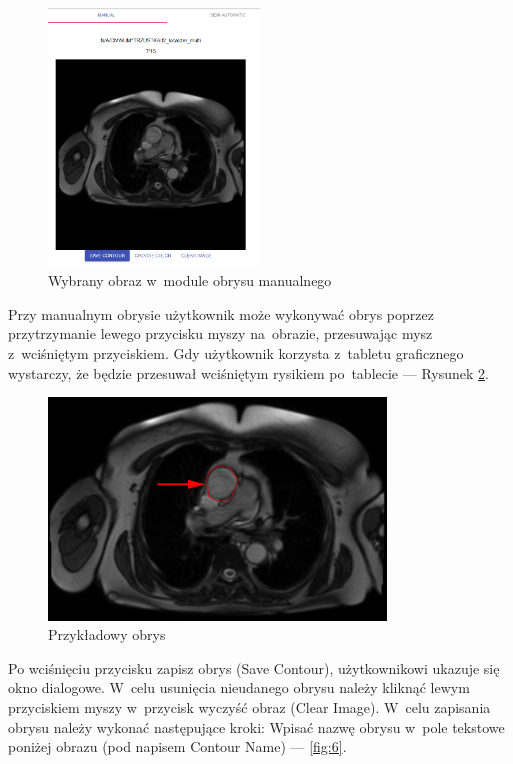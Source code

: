 \documentclass[a4paper,11pt,twoside,openright]{report}
\theoremstyle{definition}
\begin{document}
\begin{enumerate}
\begin{figure}[h!]
	\center
	\includegraphics[width=0.5\textwidth]{4}
	\caption{Wybrany obraz w~module obrysu manualnego}
    	\label{fig:4}
\end{figure}

Przy manualnym obrysie użytkownik może wykonywać obrys poprzez przytrzymanie
lewego przycisku myszy na~obrazie, przesuwając mysz z~wciśniętym przyciskiem.
Gdy użytkownik korzysta z~tabletu graficznego wystarczy, że będzie przesuwał
wciśniętym rysikiem po~tablecie --- Rysunek \ref{fig:5}.

\begin{figure}[h!]
	\center
	\includegraphics[width=0.8\textwidth]{5}
	\caption{Przykładowy obrys}
    	\label{fig:5}
\end{figure}

\pagebreak

Po wciśnięciu przycisku zapisz obrys (Save Contour), użytkownikowi ukazuje się
okno dialogowe. W~celu usunięcia nieudanego obrysu należy kliknąć lewym przyciskiem
myszy w~przycisk wyczyść obraz (Clear Image). W~celu zapisania obrysu należy
wykonać następujące kroki: Wpisać nazwę obrysu w~pole tekstowe poniżej obrazu
(pod napisem Contour Name)  --- \ref{fig:6}.


\end{enumerate}
\end{document}

